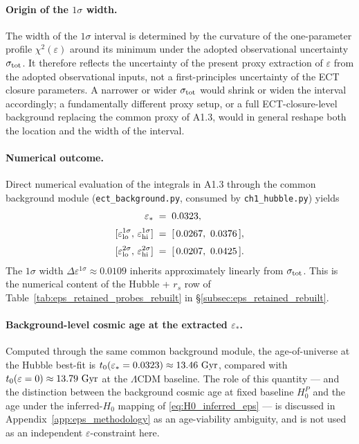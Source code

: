 \paragraph{Origin of the $1\sigma$ width.}
The width of the $1\sigma$ interval is determined by the curvature
of the one-parameter profile $\chi^2(\varepsilon)$ around its
minimum under the adopted observational uncertainty
$\sigma_{\rm tot}$. It therefore reflects the uncertainty of the
present proxy extraction of $\varepsilon$ from the adopted
observational inputs, not a first-principles uncertainty of the
ECT closure parameters. A narrower or wider $\sigma_{\rm tot}$
would shrink or widen the interval accordingly; a fundamentally
different proxy setup, or a full ECT-closure-level background
replacing the common proxy of A1.3, would in general reshape both
the location and the width of the interval.

\paragraph{Numerical outcome.}
Direct numerical evaluation of the integrals in A1.3 through the
common background module
(\texttt{ect\_background.py}, consumed by
\texttt{ch1\_hubble.py}) yields
\begin{align}
\varepsilon_*
&\;=\; 0.0323,
\label{eq:eps_hubble_central}
\\[2pt]
[\varepsilon_{\rm lo}^{1\sigma},\,\varepsilon_{\rm hi}^{1\sigma}]
&\;=\; [\,0.0267,\ 0.0376\,],
\\[2pt]
[\varepsilon_{\rm lo}^{2\sigma},\,\varepsilon_{\rm hi}^{2\sigma}]
&\;=\; [\,0.0207,\ 0.0425\,].
\end{align}
The $1\sigma$ width $\Delta\varepsilon^{1\sigma} \approx 0.0109$
inherits approximately linearly from $\sigma_{\rm tot}$. This is
the numerical content of the Hubble + $r_s$ row of
Table~\ref{tab:eps_retained_probes_rebuilt} in
\S\ref{subsec:eps_retained_rebuilt}.

\paragraph{Background-level cosmic age at the extracted
$\varepsilon_*$.}
Computed through the same common background module, the
age-of-universe at the Hubble best-fit is
$t_0(\varepsilon_* = 0.0323) \approx 13.46~{\rm Gyr}$, compared
with $t_0(\varepsilon = 0) \approx 13.79~{\rm Gyr}$ at the
$\Lambda$CDM baseline. The role of this quantity --- and the
distinction between the background cosmic age at fixed baseline
$H_0^P$ and the age under the inferred-$H_0$ mapping of
\eqref{eq:H0_inferred_eps} --- is discussed in
Appendix~\ref{app:eps_methodology} as an age-viability ambiguity,
and is not used as an independent $\varepsilon$-constraint here.

